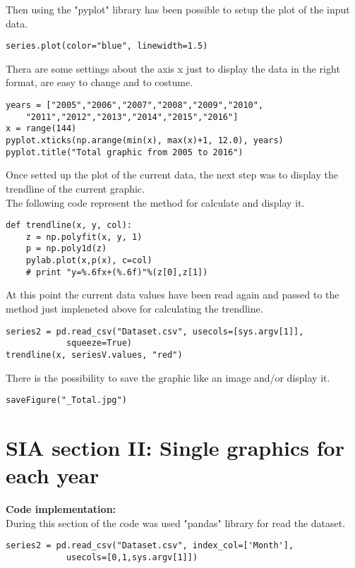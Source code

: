 Then using the "pyplot" library has been possible to setup the plot of the input data.
\begin{lstlisting}
series.plot(color="blue", linewidth=1.5)
\end{lstlisting}


Thera are some settings about the axis x just to display the data in the right format, are easy to change and to costume.
\begin{lstlisting}
years = ["2005","2006","2007","2008","2009","2010",
	"2011","2012","2013","2014","2015","2016"]
x = range(144)
pyplot.xticks(np.arange(min(x), max(x)+1, 12.0), years)
pyplot.title("Total graphic from 2005 to 2016")
\end{lstlisting}

Once setted up the plot of the current data, the next step was to display the trendline of the current graphic. \\ 
The following code represent the method for calculate and display it.
\begin{lstlisting}
def trendline(x, y, col):
	z = np.polyfit(x, y, 1)
	p = np.poly1d(z)
	pylab.plot(x,p(x), c=col)
	# print "y=%.6fx+(%.6f)"%(z[0],z[1])
\end{lstlisting}	

At this point the current data values have been read again and passed to the method just impleneted above for calculating the trendline.
\begin{lstlisting}
series2 = pd.read_csv("Dataset.csv", usecols=[sys.argv[1]],
			squeeze=True)
trendline(x, seriesV.values, "red")
\end{lstlisting}

There is the possibility to save the graphic like an image and/or display it.
\begin{lstlisting}
saveFigure("_Total.jpg")
\end{lstlisting}


\section{SIA section II: Single graphics for each year}
\label{SIA_section_II}
\textbf{Code implementation:}\\
During this section of the code was used "pandas" library for read the dataset.
\begin{lstlisting}
series2 = pd.read_csv("Dataset.csv", index_col=['Month'],
			usecols=[0,1,sys.argv[1]])
\end{lstlisting}

